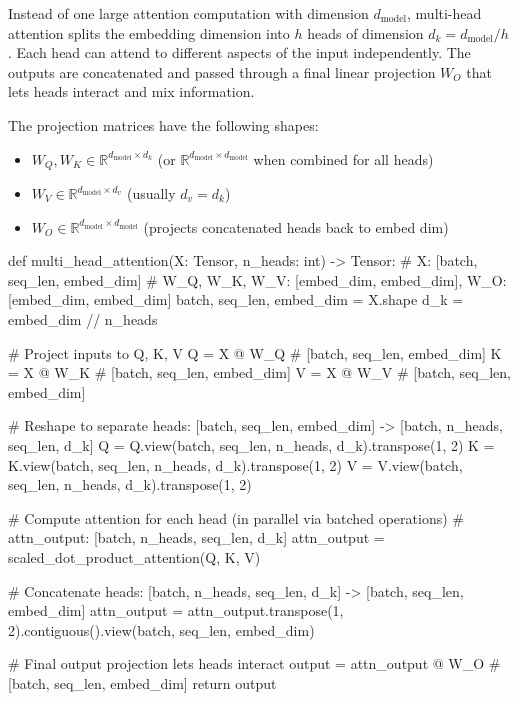 Instead of one large attention computation with dimension $d_{\text{model}}$,
multi-head attention splits the embedding dimension into $h$ heads of dimension
$d_k = d_{\text{model}} / h$. Each head can attend to different aspects of the
input independently. The outputs are concatenated and passed through a final
linear projection $W_O$ that lets heads interact and mix information.

The projection matrices have the following shapes:
\begin{itemize}
  \item $W_Q, W_K \in \mathbb{R}^{d_{\text{model}} \times d_k}$ (or $\mathbb{R}^{d_{\text{model}} \times d_{\text{model}}}$ when combined for all heads)
  \item $W_V \in \mathbb{R}^{d_{\text{model}} \times d_v}$ (usually $d_v = d_k$)
  \item $W_O \in \mathbb{R}^{d_{\text{model}} \times d_{\text{model}}}$ (projects concatenated heads back to embed dim)
\end{itemize}

\begin{pseudocode}
def multi_head_attention(X: Tensor, n_heads: int) -> Tensor:
    # X: [batch, seq_len, embed_dim]
    # W_Q, W_K, W_V: [embed_dim, embed_dim], W_O: [embed_dim, embed_dim]
    batch, seq_len, embed_dim = X.shape
    d_k = embed_dim // n_heads

    # Project inputs to Q, K, V
    Q = X @ W_Q  # [batch, seq_len, embed_dim]
    K = X @ W_K  # [batch, seq_len, embed_dim]
    V = X @ W_V  # [batch, seq_len, embed_dim]

    # Reshape to separate heads: [batch, seq_len, embed_dim] -> [batch, n_heads, seq_len, d_k]
    Q = Q.view(batch, seq_len, n_heads, d_k).transpose(1, 2)
    K = K.view(batch, seq_len, n_heads, d_k).transpose(1, 2)
    V = V.view(batch, seq_len, n_heads, d_k).transpose(1, 2)

    # Compute attention for each head (in parallel via batched operations)
    # attn_output: [batch, n_heads, seq_len, d_k]
    attn_output = scaled_dot_product_attention(Q, K, V)

    # Concatenate heads: [batch, n_heads, seq_len, d_k] -> [batch, seq_len, embed_dim]
    attn_output = attn_output.transpose(1, 2).contiguous().view(batch, seq_len, embed_dim)

    # Final output projection lets heads interact
    output = attn_output @ W_O  # [batch, seq_len, embed_dim]
    return output
\end{pseudocode}

